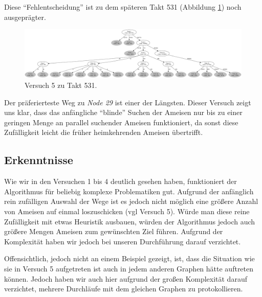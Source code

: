 Diese "`Fehlentscheidung"' ist zu dem späteren Takt 531 (Abbildung \ref{fig:v5_531}) noch ausgeprägter.

\begin{figure}[htbp]
	\includegraphics[width=\textwidth]{images/v5_531.png}
	\caption{Versuch 5 zu Takt 531.}
	\label{fig:v5_531}
\end{figure}

Der präferierteste Weg zu \emph{Node 29} ist einer der Längsten. 
Dieser Versuch zeigt uns klar, dass das anfängliche "`blinde"' Suchen der Ameisen  nur bis zu einer geringen Menge an parallel suchender Ameisen funktioniert, da sonst diese Zufälligkeit leicht die früher heimkehrenden Ameisen übertrifft.

\subsection{Erkenntnisse}
Wie wir in den Versuchen 1 bis 4 deutlich gesehen haben, funktioniert der Algorithmus für beliebig komplexe Problematiken gut.
Aufgrund der anfänglich rein zufälligen Auswahl der Wege ist es jedoch nicht möglich eine größere Anzahl von Ameisen auf einmal loszuschicken (vgl Versuch 5).
Würde man diese reine Zufälligkeit mit etwas Heuristik ausbauen, würden der Algorithmus jedoch auch größere Mengen Ameisen zum gewünschten Ziel führen.
Aufgrund der Komplexität haben wir jedoch bei unseren Durchführung darauf verzichtet.\par 
Offensichtlich, jedoch nicht an einem Beispiel gezeigt, ist, dass die Situation wie sie in Versuch 5 aufgetreten ist auch in jedem anderen Graphen hätte auftreten können. Jedoch haben wir auch hier aufgrund der großen Komplexität darauf verzichtet, mehrere Durchläufe mit dem gleichen Graphen zu protokollieren.

